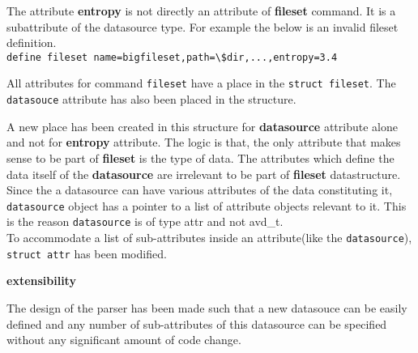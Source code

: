 The attribute \textbf{entropy} is not directly an attribute of \textbf{fileset} command. It is a subattribute of the datasource type. For example the below is an invalid fileset definition.\\
\indent \verb+define fileset name=bigfileset,path=\$dir,...,entropy=3.4+

\noindent All attributes for command \verb+fileset+ have a place in the \verb+struct fileset+. The \verb+datasouce+ attribute has also been placed in the structure.

\noindent A new place has been created in this structure for \textbf{datasource} attribute alone and not for \textbf{entropy} attribute. The logic is that, the only attribute that makes sense to be part of \textbf{fileset} is the type of data. The attributes which define the data itself of the \textbf{datasource} are irrelevant to be part of \textbf{fileset} datastructure.\\
\noindent Since the a datasource can have various attributes of the data constituting it, \verb+datasource+ object has a pointer to a list of attribute objects relevant to it. This is the reason \verb+datasource+ is of type attr and not avd\_t. \\
\noindent To accommodate  a list of sub-attributes inside an attribute(like the \verb+datasource+), \verb+struct attr+ has been modified.




\textbf{extensibility}

The design of the parser has been made such that a new datasouce can be easily defined and any number of sub-attributes of this datasource can be specified without any significant amount of code change.


\noindent 



